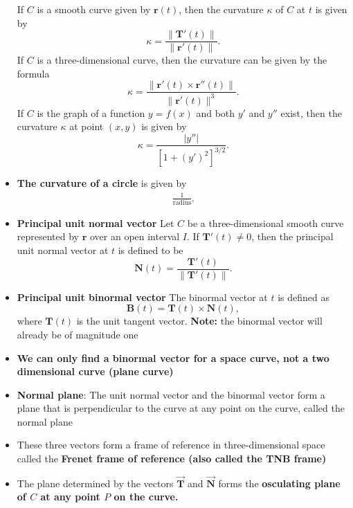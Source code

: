\documentclass{report}
\begin{document}
\begin{itemize}
            If $C$ is a smooth curve given by $\mathbf{r}(t)$, then the curvature $\kappa$ of $C$ at $t$ is given by
            \begin{equation}
                \kappa = \frac{\|\mathbf{T}'(t)\|}{\|\mathbf{r}'(t)\|}.
            \end{equation}
            If $C$ is a three-dimensional curve, then the curvature can be given by the formula
            \begin{equation}
                \kappa = \frac{\|\mathbf{r}'(t) \times \mathbf{r}''(t)\|}{\|\mathbf{r}'(t)\|^3}.
            \end{equation}
            If $C$ is the graph of a function $y=f(x)$ and both $y'$ and $y''$ exist, then the curvature $\kappa$ at point $(x,y)$ is given by
            \begin{equation}
                \kappa = \frac{|y''|}{[1+(y')^2]^{3/2}}.
            \end{equation}
        \item \textbf{The curvature of a circle} is given by 
            \begin{align*}
                \frac{1}{\text{radius}}
            .\end{align*}
        \item \textbf{Principal unit normal vector}
            Let $C$ be a three-dimensional smooth curve represented by $\mathbf{r}$ over an open interval $I$. If $\mathbf{T}'(t) \neq 0$, then the principal unit normal vector at $t$ is defined to be
            \begin{equation}
                \mathbf{N}(t) = \frac{\mathbf{T}'(t)}{\|\mathbf{T}'(t)\|}.
            \end{equation}
        \item \textbf{Principal unit binormal vector}
            The binormal vector at $t$ is defined as
            \begin{equation}
                \mathbf{B}(t) = \mathbf{T}(t) \times \mathbf{N}(t),
            \end{equation}
            where $\mathbf{T}(t)$ is the unit tangent vector.
            \bigbreak \noindent 
            \textbf{Note:} the binormal vector will already be of magnitude one
        \item \textbf{We can only find a binormal vector for a space curve, not a two dimensional curve (plane curve)}
        \item \textbf{Normal plane}: The unit normal vector and the binormal vector form a plane that is perpendicular to the curve at any point on the curve, called the normal plane
        \item These three vectors form a frame of reference in three-dimensional space called the \textbf{Frenet frame of reference (also called the TNB frame)}
        \item The plane determined by the vectors $\vec{\mathbf{T}}$ and $\vec{\mathbf{N}}$ forms the \textbf{osculating plane of $C$ at any point $P$ on the curve.}
    \end{itemize}
\end{document}
